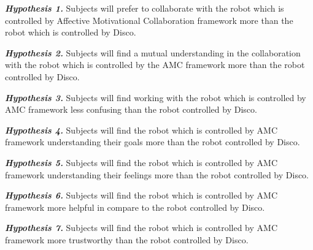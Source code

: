 \documentclass{sig-alternate-05-2015}
\begin{document}
\textit{\textbf{Hypothesis 1.}} Subjects will prefer to collaborate with the
robot which is controlled by Affective Motivational Collaboration framework more
than the robot which is controlled by Disco.

\textit{\textbf{Hypothesis 2.}} Subjects will find a mutual understanding in the
collaboration with the robot which is controlled by the AMC framework more than
the robot controlled by Disco.

\textit{\textbf{Hypothesis 3.}} Subjects will find working with the robot which
is controlled by AMC framework less confusing than the robot controlled by
Disco.

\textit{\textbf{Hypothesis 4.}} Subjects will find the robot which is controlled
by AMC framework understanding their goals more than the robot controlled by
Disco.

\textit{\textbf{Hypothesis 5.}} Subjects will find the robot which is controlled
by AMC framework understanding their feelings more than the robot controlled by
Disco.

\textit{\textbf{Hypothesis 6.}} Subjects will find the robot which is controlled
by AMC framework more helpful in compare to the robot controlled by Disco.

\textit{\textbf{Hypothesis 7.}} Subjects will find the robot which is controlled
by AMC framework more trustworthy than the robot controlled by Disco.
\end{document}

